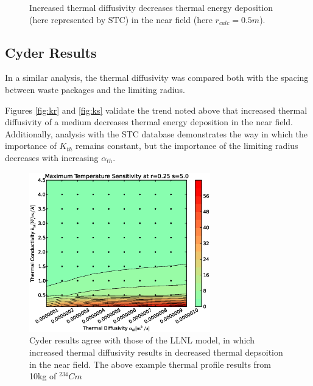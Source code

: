 \begin{figure}[htbp!]
\begin{center}
\end{center}
\caption[$K_{th}$ Sensitivity for High $\alpha_{th}$]{Increased thermal diffusivity decreases thermal energy deposition 
(here represented by \gls{STC}) in the near field (here $r_{calc} = 0.5m$).}
\label{fig:Cm242alpha_kth_high}
\end{figure}


\subsection{Cyder Results}

In a similar analysis, the thermal diffusivity was compared both with the 
spacing between waste packages and the limiting radius. 

Figures \ref{fig:kr} and \ref{fig:ks} validate the trend noted above that 
increased thermal diffusivity of a medium decreases thermal energy deposition 
in the near field.  Additionally, analysis with the \Cyder STC database 
demonstrates the way in which the importance of $K_{th}$ remains constant, but 
the importance of the limiting radius decreases with increasing $\alpha_{th}$.

\begin{figure}[htbp!]
\begin{center}
\includegraphics[width=0.7\textwidth]{./chapters/demonstration/diffusivity/ak.eps}
\end{center}
\caption[$\alpha_{th}$ vs. $K_{th}$ Sensitivity in Cyder]{Cyder results agree 
with those of the LLNL model, in which increased thermal diffusivity results in 
decreased thermal depsoition in the near field. The above example thermal 
profile results from 10kg of $^{234}Cm$} 
\label{fig:ar}
\end{figure}


